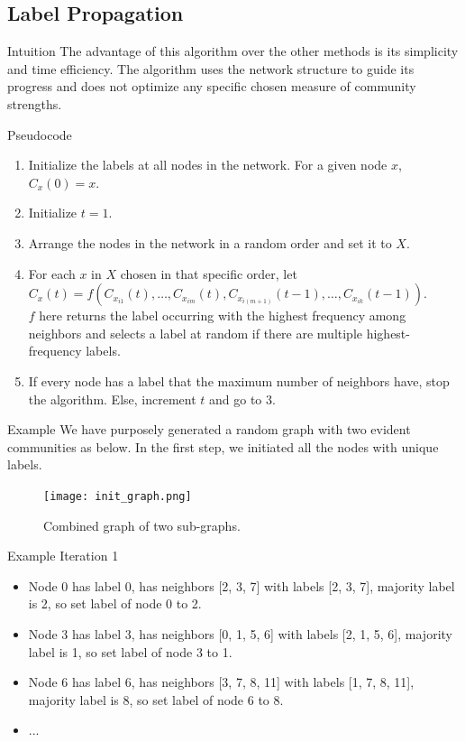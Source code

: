 \subsection{Label Propagation}
\begin{frame}[fragile]{Intuition}
 The advantage of this algorithm over the other methods is its simplicity and time efficiency. The algorithm uses the network structure to guide its progress and does not optimize any specific chosen measure of community strengths.
\end{frame}

\begin{frame}[fragile]{Pseudocode}
\begin{enumerate}
\item Initialize the labels at all nodes in the network. For a given node $x$, $C_{x}(0) = x$.
\item Initialize $t = 1$.
\item Arrange the nodes in the network in a random order and set it to $X$.
\item For each $x$ in $X$ chosen in that specific order, let $C_{x}(t) = f(C_{x_{i1}}(t),\ldots,C_{x_{im}}(t),C_{x_{i(m+1)}}(t-1),\ldots,C_{x_{ik}}(t-1))$.\\
     $f$ here returns the label occurring with the highest frequency among neighbors and selects a label at random if there are multiple highest-frequency labels.
\item If every node has a label that the maximum number of neighbors have, stop the algorithm. Else, increment $t$ and go to 3.
\end{enumerate}
\end{frame}

\begin{frame}[fragile]{Example}
We have purposely generated a random graph with two evident communities as below. In the first step, we initiated all the nodes with unique labels.
\begin{figure}
\centering
\texttt{[image: init\_graph.png]}
\caption{Combined graph of two sub-graphs.}
\end{figure}
\end{frame}

\begin{frame}[fragile]{Example}
Iteration 1
\begin{itemize}
    \item Node 0 has label 0, has neighbors [2, 3, 7] with labels [2, 3, 7], majority label is 2, so set label of node 0 to 2.
    \item Node 3 has label 3, has neighbors [0, 1, 5, 6] with labels [2, 1, 5, 6], majority label is 1, so set label of node 3 to 1.
    \item Node 6 has label 6, has neighbors [3, 7, 8, 11] with labels [1, 7, 8, 11], majority label is 8, so set label of node 6 to 8.
    \item ...
\end{itemize}
\end{frame}

